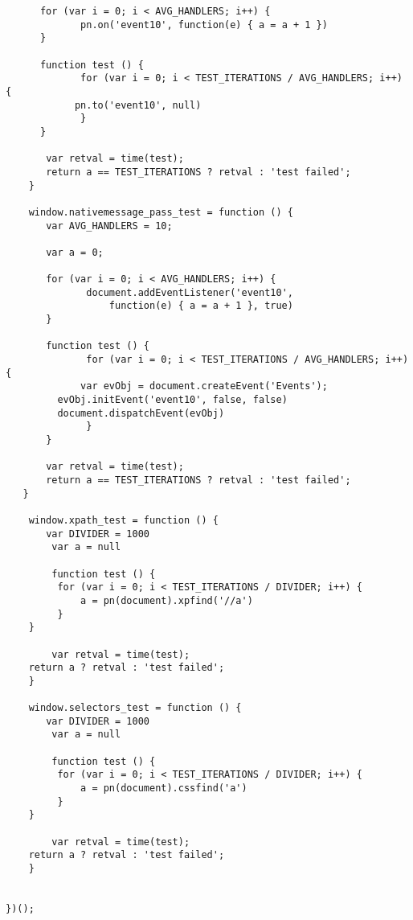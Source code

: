 \documentclass[a4papre,12pt]{article}
\begin{document}
\begin{verbatim}
	  for (var i = 0; i < AVG_HANDLERS; i++) {
      	     pn.on('event10', function(e) { a = a + 1 })
   	  }

   	  function test () {
      	     for (var i = 0; i < TEST_ITERATIONS / AVG_HANDLERS; i++) {
	     	pn.to('event10', null)
      	     }
   	  }
   
	   var retval = time(test);
   	   return a == TEST_ITERATIONS ? retval : 'test failed';
	}

	window.nativemessage_pass_test = function () { 
  	   var AVG_HANDLERS = 10;

   	   var a = 0;

   	   for (var i = 0; i < AVG_HANDLERS; i++) {
      	      document.addEventListener('event10', 
                  function(e) { a = a + 1 }, true)
   	   }

   	   function test () {
      	      for (var i = 0; i < TEST_ITERATIONS / AVG_HANDLERS; i++) {
	         var evObj = document.createEvent('Events');
	 	 evObj.initEvent('event10', false, false)
	 	 document.dispatchEvent(evObj)
      	      }
   	   }
   
	   var retval = time(test);
   	   return a == TEST_ITERATIONS ? retval : 'test failed';
   }

	window.xpath_test = function () {
	   var DIVIDER = 1000
		var a = null

		function test () {
         for (var i = 0; i < TEST_ITERATIONS / DIVIDER; i++) {
	   		 a = pn(document).xpfind('//a')
         }
   	}

		var retval = time(test);
   	return a ? retval : 'test failed';
	}

	window.selectors_test = function () {
	   var DIVIDER = 1000
		var a = null

		function test () {
         for (var i = 0; i < TEST_ITERATIONS / DIVIDER; i++) {
	   		 a = pn(document).cssfind('a')
         }
   	}

		var retval = time(test);
   	return a ? retval : 'test failed';
	}

   
})();
\end{verbatim}
\end{document}
